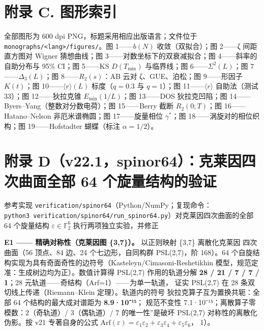 \documentclass[
]{article}
\begin{document}
\section{附录 C.
图形索引}\label{ux9644ux5f55-c.-ux56feux5f62ux7d22ux5f15}

全部图形为 600 dpi PNG，标题采用相应出版语言；文件位于
\texttt{monographs/\textless{}lang\textgreater{}/figures/}。图
1------\(b(N)\) 收敛（双拟合）；图 2------ζ 间距直方图对 Wigner
猜想曲线；图 3------对数坐标下的双衰减拟合；图 4------斜率的自助分布与
95\% CI；图 5------KS \(D(T_{\min})\) 与临界线；图
6------\(\Sigma^2(L)\)；图 7------\(\Delta_3(L)\)；图
8------\(R_2(s)\)：AB 云对 ζ、GUE、泊松；图 9------形因子 \(K(t)\)；图
10------\(\langle r\rangle(L)\) 标度（\(q=0.3\) 与 \(q=1\)）；图
11------\(\langle r\rangle\) 自助法（测试 33）；图 12------狄拉克锥
\(E_{\min}(1/L)\)；图 13------DOS 狄拉克凹陷；图
14------Byers--Yang（整数对分数电荷）；图 15------Berry 截断
\(R_2(0;T)\)；图 16------Hatano--Nelson 非厄米谱椭圆；图
17------旋量相位 \(\gamma^{\ast}\)；图 18------涡旋对的相位织构；图
19------Hofstadter 蝴蝶（标注 \(\alpha=1/2\)）。

\section{附录 D（v22.1，spinor64）：克莱因四次曲面全部 64
个旋量结构的验证}\label{ux9644ux5f55-dv22.1spinor64ux514bux83b1ux56e0ux56dbux6b21ux66f2ux9762ux5168ux90e8-64-ux4e2aux65cbux91cfux7ed3ux6784ux7684ux9a8cux8bc1}

参考实现 \texttt{verification/spinor64}（Python/NumPy；复现命令：
\texttt{python3\ verification/spinor64/run\_spinor64.py}）对克莱因四次曲面的全部
64 个旋量结构 \(\varepsilon\in\mathbb{F}_2^6\) 执行两项独立实验，并修正

\textbf{E1 ------ 精确对称性（克莱因图 \{3,7\}）。} 以正则映射 \{3,7\}
离散化克莱因 四次曲面（56 顶点、84 边、24 个七边形，自同构群
PSL(2,7)，阶 168）。64
个自旋结构实现为具有奇面奇性的边符号（Kasteleyn/Cimasoni-Reshetikhin
模型，规范定准：生成树边均为正）。数值计算得 PSL(2,7) 作用的轨道分解
\textbf{28 / 21 / 7 / 7 / 1}；28
元轨道------奇结构（Arf=1）------为单一轨道， 证实 PSL(2,7) 在 28
条双切线上传递（Riemann--Klein 定理）。轨道内的符号
狄拉克算子互为置换共轭：全部 64 个结构的最大成对谱距为
\textbf{8.9·10⁻¹⁵}； 规范不变性 7.1·10⁻¹⁵；离散算子零模数：2（奇轨道）/
3（偶轨道）/ 7
的唯一性''是破坏 PSL(2,7) 对称性的离散化伪影。按 v21 专著自身的公式
\(\mathrm{Arf}(\varepsilon)=\varepsilon_1\varepsilon_2+\varepsilon_3\varepsilon_4+\varepsilon_5\varepsilon_6\)，
1）。
\end{document}
